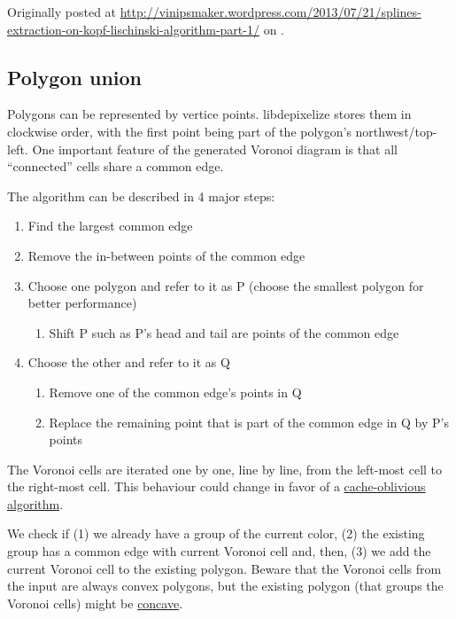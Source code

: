 Originally posted at
\url{http://vinipsmaker.wordpress.com/2013/07/21/splines-extraction-on-kopf-lischinski-algorithm-part-1/}
on .

\subsection{Polygon union}

Polygons can be represented by vertice points. libdepixelize stores them in
clockwise order, with the first point being part of the polygon's
northwest/top-left. One important feature of the generated Voronoi diagram
is that all ``connected'' cells share a common edge.

The algorithm can be described in 4 major steps:

\begin{enumerate}
\item Find the largest common edge
\item Remove the in-between points of the common edge
\item Choose one polygon and refer to it as P (choose the smallest polygon for
  better performance)
  \begin{enumerate}
  \item 
    Shift P such as P's head and tail are points of the common edge
  \end{enumerate}
\item Choose the other and refer to it as Q
  \begin{enumerate}
  \item Remove one of the common edge's points in Q
  \item Replace the remaining point that is part of the common edge in Q by P's
    points
  \end{enumerate}
\end{enumerate}

The Voronoi cells are iterated one by one, line by line, from the left-most cell
to the right-most cell. This behaviour could change in favor of a
\href{http://en.wikipedia.org/wiki/Cache-oblivious_algorithm}{cache-oblivious
algorithm}.

We check if (1) we already have a group of the current color, (2) the existing
group has a common edge with current Voronoi cell and, then, (3) we add the
current Voronoi cell to the existing polygon. Beware that the Voronoi cells from
the input are always convex polygons, but the existing polygon (that groups the
Voronoi cells) might be
\href{http://en.wikipedia.org/wiki/Concave_polygon}{concave}.

